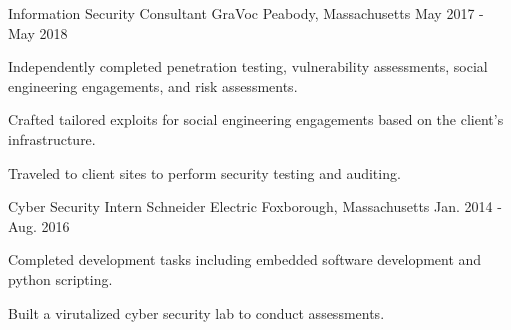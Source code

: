 \begin{cventries}
  \cventry
    {Information Security Consultant} %
    {GraVoc} %
    {Peabody, Massachusetts} %
    {May 2017 - May 2018} %
    {
      \begin{cvitems} %
        \item {
          Independently completed penetration testing, vulnerability assessments, social engineering engagements, and risk assessments.
        }
        \item {
          Crafted tailored exploits for social engineering engagements based on the client's infrastructure.
        }
        \item {
          Traveled to client sites to perform security testing and auditing.
        }
      \end{cvitems}
    }

  \cventry
    {Cyber Security Intern} %
    {Schneider Electric} %
    {Foxborough, Massachusetts} %
    {Jan. 2014 - Aug. 2016} %
    {
      \begin{cvitems} %
        \item {
          Completed development tasks including embedded software development and python scripting.
        }
        \item {
          Built a virutalized cyber security lab to conduct assessments.
        }
      \end{cvitems}
    }

\end{cventries}
